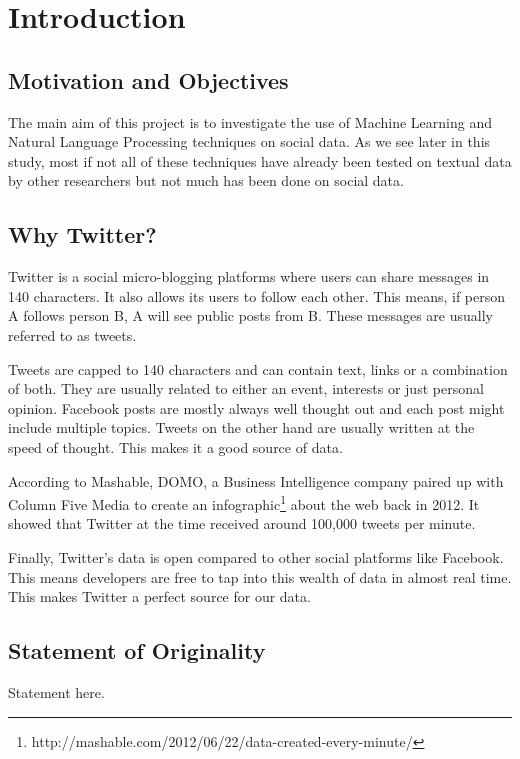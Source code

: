 
\chapter{Introduction}


\section{Motivation and Objectives}
The main aim of this project is to investigate the use of Machine Learning and Natural Language
Processing techniques on social data. As we see later in this study, most if not all of these
techniques have already been tested on textual data by other researchers but not much has been done
on social data.

\section{Why Twitter?}
Twitter is a social micro-blogging platforms where users can share messages in 140 characters.
It also allows its users to follow each other. This means, if person A follows person B, A will see
public posts from B. These messages are usually referred to as tweets.

Tweets are capped to 140 characters and can contain text, links or a combination of both. They are
usually related to either an event, interests or just personal opinion. Facebook posts are mostly
always well thought out and each post might include multiple topics. Tweets on the other hand are
usually written at the speed of thought. This makes it a good source of data.

According to Mashable, DOMO, a Business Intelligence company paired up with Column Five Media to
create an infographic\footnote{http://mashable.com/2012/06/22/data-created-every-minute/} about the
web back in 2012. It showed that Twitter at the time received around 100,000 tweets per minute.

Finally, Twitter's data is open compared to other social platforms like Facebook. This means
developers are free to tap into this wealth of data in almost real time. This makes Twitter a
perfect source for our data.


\section{Statement of Originality}

Statement here.

